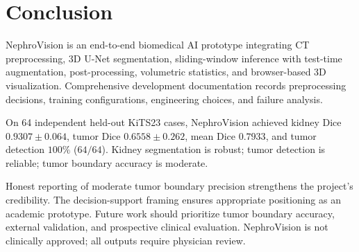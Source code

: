 ﻿\section{Conclusion}

NephroVision is an end-to-end biomedical AI prototype integrating CT preprocessing, 3D U-Net segmentation, sliding-window inference with test-time augmentation, post-processing, volumetric statistics, and browser-based 3D visualization. Comprehensive development documentation records preprocessing decisions, training configurations, engineering choices, and failure analysis.

On 64 independent held-out KiTS23 cases, NephroVision achieved kidney Dice $0.9307 \pm 0.064$, tumor Dice $0.6558 \pm 0.262$, mean Dice $0.7933$, and tumor detection $100\%$ ($64/64$). Kidney segmentation is robust; tumor detection is reliable; tumor boundary accuracy is moderate.

Honest reporting of moderate tumor boundary precision strengthens the project's credibility. The decision-support framing ensures appropriate positioning as an academic prototype. Future work should prioritize tumor boundary accuracy, external validation, and prospective clinical evaluation. NephroVision is not clinically approved; all outputs require physician review.
